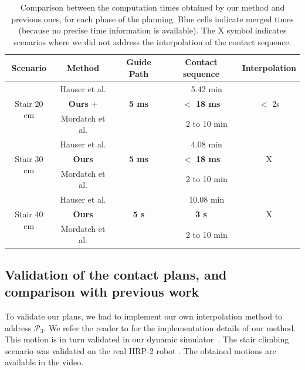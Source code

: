 \begin{table}
\centering
\begin{tabular}{ c | c | c | c | c }
 Scenario & Method  & Guide Path & Contact sequence & Interpolation \\
 \hline
   \multirow{3}{*}{Stair 20 cm} & Hauser et al. \citeauthor{Hauser06usingmotion} &  \multicolumn{3}{c}{\cellcolor{blue!25}5.42 min}  \\
							 & \textbf{Ours} + \citeauthor{Carpentier2016}  & \textbf{5 ms} & $\mathbf{<}$ \textbf{18 ms} & $ <$ 2s \\
							 & Mordatch et al. \citeauthor{Mordatch:2012:DCB:2185520.2185539} &  \multicolumn{3}{c}{\cellcolor{blue!25}2 to 10 min} \\
 \hline
   \multirow{3}{*}{Stair 30 cm} & Hauser et al. \citeauthor{Hauser06usingmotion} &  \multicolumn{3}{c}{\cellcolor{blue!25}4.08 min}  \\
							 & \textbf{Ours}  & \textbf{5 ms} & $\mathbf{<}$ \textbf{18 ms} & X \\
							 &  Mordatch et al. \citeauthor{Mordatch:2012:DCB:2185520.2185539} &  \multicolumn{3}{c}{\cellcolor{blue!25}2 to 10 min} \\
 \hline
   \multirow{3}{*}{Stair 40 cm} & Hauser et al. \citeauthor{Hauser06usingmotion} &  \multicolumn{3}{c}{\cellcolor{blue!25}10.08 min}  \\
							 & \textbf{Ours}  & \textbf{5 s} & \textbf{3 s} & X \\
							 &  Mordatch et al. \citeauthor{Mordatch:2012:DCB:2185520.2185539} &  \multicolumn{3}{c}{\cellcolor{blue!25}2 to 10 min} \\
 \end{tabular}
\caption{Comparison between the computation times obtained by our method and previous ones, for each phase of the planning. Blue cells indicate merged times (because no
precise time information is available). The X symbol indicates scenarios where we did not address the interpolation of the contact sequence.}
\label{tab:compprev}
\quad
\end{table}

\subsection{Validation of the contact plans, and comparison with previous work} \label{sec:compa}
To validate our plans, we had to implement our own interpolation method to address $\mathcal{P}_3$.
We refer the reader to \citep{Carpentier2016} for the implementation details of our method. 
This motion is in turn validated in our dynamic simulator~\citep{DelPrete2015b}. The stair climbing scenario was validated on the real HRP-2 robot \citep{Carpentier2016}.
The obtained motions are available in the video.

